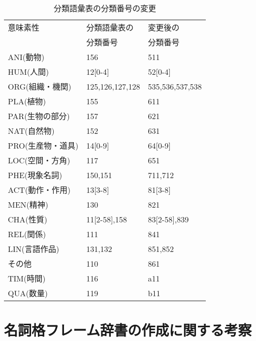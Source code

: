 \begin{table}[t]
    \caption{分類語彙表の分類番号の変更}
    \vspace{-1mm}
    \label{tab:bunrui_code_change}
  \begin{center}
\begin{tabular}[c]{|l|l|l|}\hline
意味素性          & 分類語彙表の        & 変更後の\\
                  &   分類番号            &        分類番号\\\hline
ANI(動物)         &  156                & 511\\[0cm]\hline
HUM(人間)         &  12[0-4]            & 52[0-4]\\[0cm]\hline
ORG(組織・機関)   &  125,126,127,128    & 535,536,537,538\\[0cm]\hline
PLA(植物)         &  155                & 611\\[0cm]\hline
PAR(生物の部分)   &  157                & 621\\[0cm]\hline
NAT(自然物)       &  152                & 631\\[0cm]\hline
PRO(生産物・道具) &  14[0-9]            & 64[0-9]\\[0cm]\hline
LOC(空間・方角)   &  117                & 651\\[0cm]\hline
PHE(現象名詞)     &  150,151            & 711,712\\[0cm]\hline
ACT(動作・作用)   &  13[3-8]            & 81[3-8]\\[0cm]\hline
MEN(精神)         &  130                & 821\\[0cm]\hline
CHA(性質)         &  11[2-58],158       & 83[2-58],839\\[0cm]\hline
REL(関係)         &  111                & 841\\[0cm]\hline
LIN(言語作品)     &  131,132            & 851,852\\[0cm]\hline
その他            &  110                & 861\\[0cm]\hline
TIM(時間)         &  116                & a11\\[0cm]\hline
QUA(数量)         &  119                & b11\\[0cm]\hline
\end{tabular}
\vspace*{-3mm}
\end{center}
\end{table}

\section{名詞格フレーム辞書の作成に関する考察}

